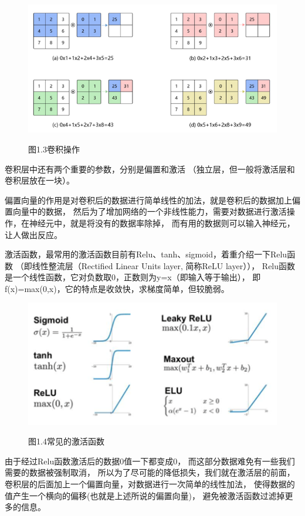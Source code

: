 \documentclass[10.5pt,compsoc,UTF8]{CjC}
\theoremstyle{mystyle}
\begin{document}
\begin{figure}[htbp]
\centering
\centerline{\includegraphics[width=1\linewidth]{CNN3.png}}

\heiti 图1.3\quad  卷积操作
\label{fig1}
\end{figure}

卷积层中还有两个重要的参数，分别是偏置和激活
（独立层，但一般将激活层和卷积层放在一块）。

偏置向量的作用是对卷积后的数据进行简单线性的加法，就是卷积后的数据加上偏置向量中的数据，
然后为了增加网络的一个非线性能力，需要对数据进行激活操作，在神经元中，就是将没有的数据率除掉，
而有用的数据则可以输入神经元，让人做出反应。

激活函数，最常用的激活函数目前有Relu、tanh、sigmoid，着重介绍一下Relu函数
（即线性整流层（Rectified Linear Units layer, 简称ReLU layer）），
Relu函数是一个线性函数，它对负数取0，正数则为y=x（即输入等于输出），
即f(x)=max(0,x)，它的特点是收敛快，求梯度简单，但较脆弱。

\begin{figure}[htbp]
\centering
\centerline{\includegraphics[width=0.6\linewidth]{CNN4.png}}
\heiti 图1.4\quad  常见的激活函数
\label{fig1}
\end{figure}

由于经过Relu函数激活后的数据0值一下都变成0，
而这部分数据难免有一些我们需要的数据被强制取消，
所以为了尽可能的降低损失，我们就在激活层的前面，
卷积层的后面加上一个偏置向量，对数据进行一次简单的线性加法，
使得数据的值产生一个横向的偏移(也就是上述所说的偏置向量)，
避免被激活函数过滤掉更多的信息。
\end{document}
